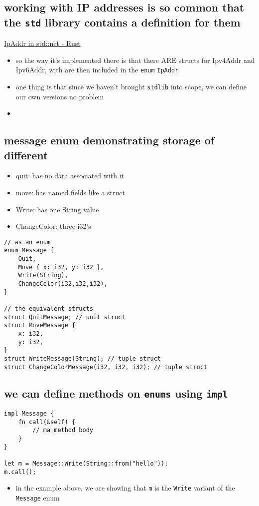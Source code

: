 \documentclass[11pt]{article}
\begin{document}
\subsection{working with IP addresses is so common  that the \texttt{std} library contains a definition for them}
\label{sec:org235cbb2}
\href{https://doc.rust-lang.org/std/net/enum.IpAddr.html}{IpAddr in std::net - Rust} 
\begin{itemize}
\item so the way it's implemented there is that there ARE structs for Ipv4Addr and Ipv6Addr, with are then included in the \texttt{enum} \texttt{IpAddr}
\item one thing is that since we haven't brought \texttt{stdlib} into scope, we can define our own versions no problem
\item 
\end{itemize}

\subsection{message enum demonstrating storage of different}
\label{sec:orgc2630d6}

\begin{itemize}
\item quit: has no data associated with it
\item move: has named fields like a struct
\item Write: has one String value
\item ChangeColor: three i32's
\end{itemize}
\begin{verbatim}
// as an enum
enum Message {
    Quit,
    Move { x: i32, y: i32 },
    Write(String),
    ChangeColor(i32,i32,i32),
}

// the equivalent structs
struct QuitMessage; // unit struct
struct MoveMessage {
    x: i32,
    y: i32,
}
struct WriteMessage(String); // tuple struct
struct ChangeColorMessage(i32, i32, i32); // tuple struct

\end{verbatim}

\subsection{we can define methods on \texttt{enums} using \texttt{impl}}
\label{sec:org612e271}
\begin{verbatim}
impl Message {
    fn call(&self) {
        // ma method body
    }
}

let m = Message::Write(String::from("hello"));
m.call();
\end{verbatim}
\begin{itemize}
\item in the example above, we are showing that \texttt{m} is the \texttt{Write} variant of the \texttt{Message} enum
\end{itemize}
\end{document}
